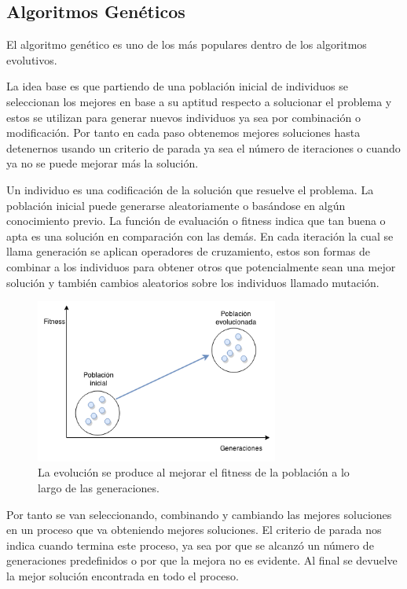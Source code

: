 \subsection{Algoritmos Genéticos}
El algoritmo genético es uno de los más populares dentro de los algoritmos evolutivos.

La idea base es que partiendo de una población inicial de individuos se seleccionan los mejores en base a su aptitud respecto a solucionar el problema y estos se utilizan para generar nuevos individuos ya sea por combinación o modificación. Por tanto en cada paso obtenemos mejores soluciones hasta detenernos usando un criterio de parada ya sea el número de iteraciones o cuando ya no se puede mejorar más la solución.

Un individuo es una codificación de la solución que resuelve el problema.
La población inicial puede generarse aleatoriamente o basándose en algún conocimiento previo.
La función de evaluación o fitness indica que tan buena o apta es una solución en comparación con las demás.
En cada iteración la cual se llama generación se aplican operadores de cruzamiento, estos son formas de combinar a los individuos para obtener otros que potencialmente sean una mejor solución y también cambios aleatorios sobre los individuos llamado mutación.


\begin{figure}[H]
	\centering
	\includegraphics[width=8cm]{Figures/fitness_generaciones}
	\caption{La evolución se produce al mejorar el fitness de la población a lo largo de las generaciones.}
	\label{fig:fitness_generaciones}
\end{figure}



Por tanto se van seleccionando, combinando y cambiando las mejores soluciones en un proceso que va obteniendo mejores soluciones.
El criterio de parada nos indica cuando termina este proceso, ya sea por que se alcanzó un número de generaciones predefinidos o por que la mejora no es evidente. Al final se devuelve la mejor solución encontrada en todo el proceso.

